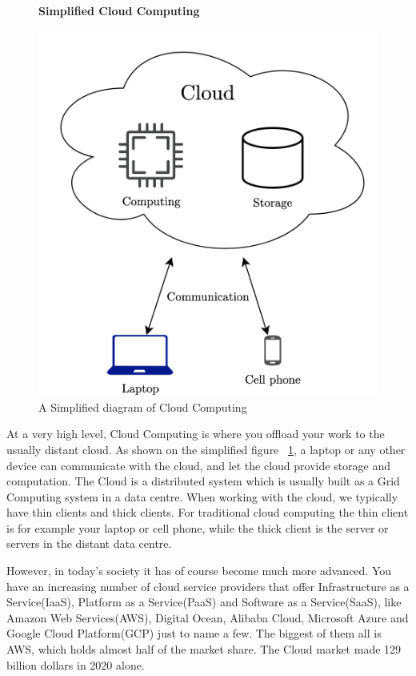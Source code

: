 \begin{figure}[t]
    \centering
    \textbf{Simplified Cloud Computing}\par\medskip
    \includegraphics[scale=0.7]{chapters/background/Simplified_cloud.png}
    \caption{A Simplified diagram of Cloud Computing}
    \label{fig:SimplifiedCloudDiagram}
\end{figure}

At a very high level, Cloud Computing is where you offload your work to the usually distant cloud. As shown on the simplified figure ~\ref{fig:SimplifiedCloudDiagram}, a laptop or any other device can communicate with the cloud, and let the cloud provide storage and computation. The Cloud is a distributed system which is usually built as a Grid Computing system in a data centre. When working with the cloud, we typically have thin clients and thick clients. For traditional cloud computing the thin client is for example your laptop or cell phone, while the thick client is the server or servers in the distant data centre.

However, in today's society it has of course become much more advanced. You have an increasing number of cloud service providers that offer Infrastructure as a Service(IaaS), Platform as a Service(PaaS) and Software as a Service(SaaS), like Amazon Web Services(AWS), Digital Ocean, Alibaba Cloud, Microsoft Azure and Google Cloud Platform(GCP) just to name a few. The biggest of them all is AWS, which holds almost half of the market share\cite{noauthor_cloud_2019}. The Cloud market made 129 billion dollars in 2020 alone\cite{noauthor_cloud_nodate}.

